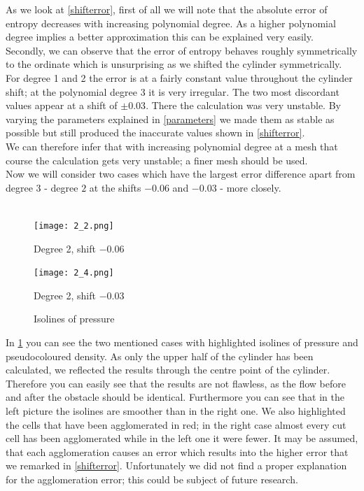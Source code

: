 	As we look at \cref{shifterror}, first of all we will note that the absolute error of entropy decreases with increasing polynomial degree. As a higher polynomial degree implies a better approximation this can be explained very easily. \\ \indent
	Secondly, we can observe that the error of entropy behaves roughly symmetrically to the ordinate which is unsurprising as we shifted the cylinder symmetrically.\\ \indent
	For degree 1 and 2 the error is at a fairly constant value throughout the cylinder shift; at the polynomial degree 3 it is very irregular. The two most discordant values appear at a shift of $\pm 0.03$. There the calculation was very unstable. By varying the parameters explained in \cref{parameters} we made them as stable as possible but still produced the inaccurate values shown in \cref{shifterror}. \\ \indent
	We can therefore infer that with increasing polynomial degree at a mesh that course the calculation gets very unstable; a finer mesh should be used. \\ \indent
	Now we will consider two cases which have the largest error difference apart from degree 3 - degree $2$ at the shifts $-0.06$ and $-0.03$ - more closely. \\\\
	
	\begin{figure}[htp]
		\centering
		\begin{minipage}[b]{0.5\textwidth}
			\centering
			\texttt{[image: 2\_2.png]}
			\caption*{Degree 2, shift $-0.06$}
			\label{fig:2_2}
		\end{minipage}%
		\begin{minipage}[b]{0.5\textwidth}
			\centering
			\texttt{[image: 2\_4.png]}
			\caption*{Degree 2, shift $-0.03$}
			\label{fig:2_4}
		\end{minipage}
		\caption{Isolines of pressure}\label{fig:isoshift}
	\end{figure}
	
	In \cref{fig:isoshift} you can see the two mentioned cases with highlighted isolines of pressure and pseudocoloured density. As only the upper half of the cylinder has been calculated, we reflected the results through the centre point of the cylinder. Therefore you can easily see that the results are not flawless, as the flow before and after the obstacle should be identical. Furthermore you can see that in the left picture the isolines are smoother than in the right one. We also highlighted the cells that have been agglomerated in red; in the right case almost every cut cell has been agglomerated while in the left one it were fewer. It may be assumed, that each agglomeration causes an error which results into the higher error that we remarked in \cref{shifterror}. Unfortunately we did not find a proper explanation for the agglomeration error; this could be subject of future research. \\\\ 
	
